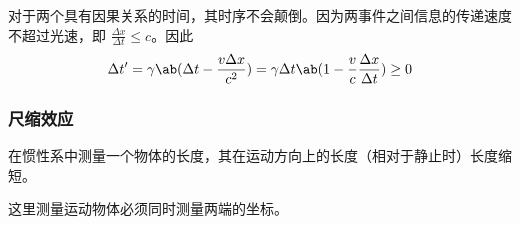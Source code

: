 对于两个具有因果关系的时间，其时序不会颠倒。因为两事件之间信息的传递速度不超过光速，即 $\frac{\Delta x}{\Delta t} \le c$。因此
$$
\Delta t' = \gamma \ab(\Delta t - \frac{v \Delta x}{c^2}) = \gamma \Delta t \ab(1 - \frac{v}{c} \frac{\Delta x}{\Delta t}) \ge 0
$$

\subsubsection{尺缩效应}

在惯性系中测量一个物体的长度，其在运动方向上的长度（相对于静止时）长度缩短。

这里测量运动物体必须同时测量两端的坐标。
